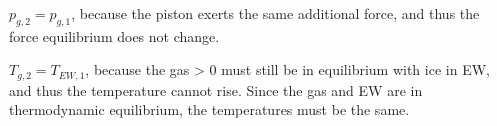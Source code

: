 \( p_{g,2} = p_{g,1} \), because the piston exerts the same additional force, and thus the force equilibrium does not change.  

\( T_{g,2} = T_{EW,1} \), because the gas > 0 must still be in equilibrium with ice in EW, and thus the temperature cannot rise. Since the gas and EW are in thermodynamic equilibrium, the temperatures must be the same.